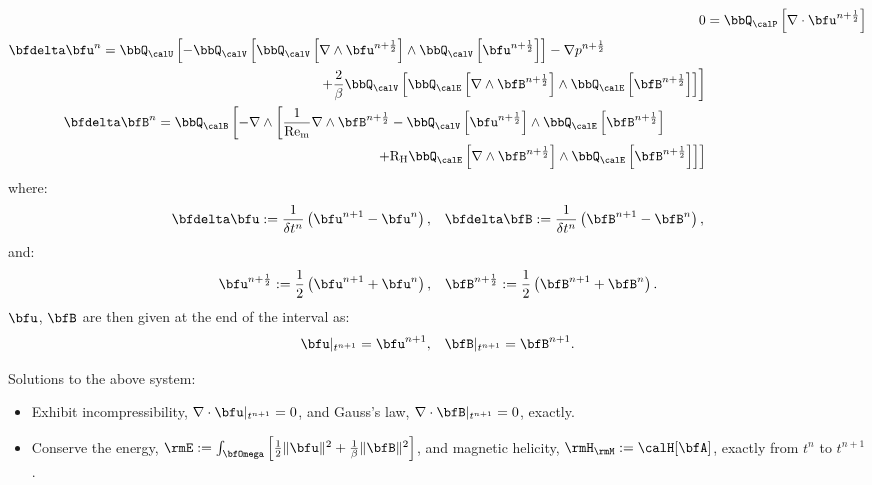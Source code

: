     \begin{align}
                           0  &=  \bbQ_{\calP}\left[\nabla\cdot\bfu^{n + \frac{1}{2}}\right]  \\
        \begin{split}
            \bfdelta\bfu^{n}  &=  \bbQ_{\calU}\left[- \bbQ_{\calV}\left[\bbQ_{\calV}\left[\nabla\wedge\bfu^{n + \frac{1}{2}}\right]\wedge\bbQ_{\calV}\left[\bfu^{n + \frac{1}{2}}\right]\right] - \nabla p^{n + \frac{1}{2}}\right.  \\
            &\qquad\qquad\qquad\qquad\qquad\qquad\qquad\qquad\left.+ \frac{2}{\beta}\bbQ_{\calV}\left[\bbQ_{\calE}\left[\nabla\wedge\bfB^{n + \frac{1}{2}}\right]\wedge\bbQ_{\calE}\left[\bfB^{n + \frac{1}{2}}\right]\right]\right]
        \end{split}  \\
        \begin{split}
            \bfdelta\bfB^{n}  &=  \bbQ_{\calB}\left[- \nabla\wedge\left[\frac{1}{\rmRem}\nabla\wedge\bfB^{n + \frac{1}{2}} - \bbQ_{\calV}\left[\bfu^{n + \frac{1}{2}}\right]\wedge\bbQ_{\calE}\left[\bfB^{n + \frac{1}{2}}\right]\right.\right.  \\
            &\qquad\qquad\qquad\qquad\qquad\qquad\qquad\qquad\left.\left.+ \rmRH\bbQ_{\calE}\left[\nabla\wedge\bfB^{n + \frac{1}{2}}\right]\wedge\bbQ_{\calE}\left[\bfB^{n + \frac{1}{2}}\right]\right]\right]
        \end{split}
    \end{align}
    where:
    \begin{align}
        \bfdelta\bfu  :=  \frac{1}{\delta t^{n}}\left(\bfu^{n + 1} - \bfu^{n}\right),  &&
        \bfdelta\bfB  :=  \frac{1}{\delta t^{n}}\left(\bfB^{n + 1} - \bfB^{n}\right),
    \end{align}
    and:
    \begin{align}
        \bfu^{n + \frac{1}{2}}  :=  \frac{1}{2}\left(\bfu^{n + 1} + \bfu^{n}\right),  &&
        \bfB^{n + \frac{1}{2}}  :=  \frac{1}{2}\left(\bfB^{n + 1} + \bfB^{n}\right).
    \end{align}
    $\bfu$, $\bfB$ are then given at the end of the interval as:
    \begin{align}
        \bfu|_{t^{n + 1}} = \bfu^{n + 1},  &&
        \bfB|_{t^{n + 1}} = \bfB^{n + 1}.
    \end{align}
    
    \shortline

    Solutions to the above system:
    \begin{itemize}
        \item  Exhibit incompressibility, $\nabla\cdot\bfu|_{t^{n + 1}}  =  0$, and Gauss's law, $\nabla\cdot\bfB|_{t^{n + 1}}  =  0$, exactly.
        \item  Conserve the energy, $\rmE  :=  \int_{\bfOmega}\left[\frac{1}{2}\|\bfu\|^{2} + \frac{1}{\beta}\|\bfB\|^{2}\right]$, and magnetic helicity, $\rmH_{\rmM}  :=  \calH[\bfA]$, exactly from $t^{n}$ to $t^{n + 1}$.
    \end{itemize}

